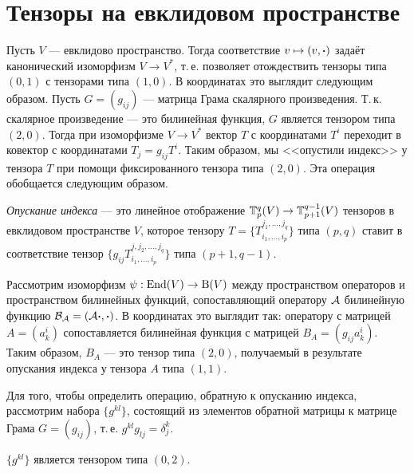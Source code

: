 \section{Тензоры на евклидовом пространстве}

Пусть $V$ --- евклидово пространство. Тогда соответствие $v \mapsto (v, \boldsymbol{\cdot})$ задаёт канонический изоморфизм $V \to V^\ast$, т.\,е. позволяет отождествить тензоры типа $(0, 1)$ с тензорами типа $(1, 0)$. В координатах это выглядит следующим образом. Пусть $G = (g_{ij})$ --- матрица Грама скалярного произведения. Т.\,к. скалярное произведение --- это билинейная функция, $G$ является тензором типа $(2, 0)$. Тогда при изоморфизме $V \to V^\ast$ вектор $T$ с координатами $T^i$ переходит в ковектор с координатами $T_j = g_{ij}T^i$. Таким образом, мы <<опустили индекс>> у тензора $T$ при помощи фиксированного тензора типа $(2, 0)$. Эта операция обобщается следующим образом.

\begin{definition}
    \textit{Опускание индекса} --- это линейное отображение $\mathbb{T}_p^q(V) \to \mathbb{T}_{p + 1}^{q - 1}(V)$ тензоров в евклидовом пространстве $V$, которое тензору $T = \{T_{i_1, \ldots, i_p}^{j_1, \ldots, j_q}\}$ типа $(p, q)$ ставит в соответствие тензор $\{g_{ij}T_{i_1, \ldots, i_p}^{j, j_2, \ldots, j_q}\}$ типа $(p + 1, q - 1)$.
\end{definition}

\begin{example}
    Рассмотрим изоморфизм $\psi: \operatorname{End}(V) \to \mathrm{B}(V)$ между пространством операторов и пространством билинейных функций, сопоставляющий оператору $\mathcal{A}$ билинейную функцию $\mathcal{B}_{\mathcal{A}} = (\mathcal{A}\boldsymbol{\cdot}, \boldsymbol{\cdot})$. В координатах это выглядит так: оператору с матрицей $A = (a^i_k)$ сопоставляется билинейная функция с матрицей $B_A = (g_{ij}a^i_k)$. Таким образом, $B_A$ --- это тензор типа $(2, 0)$, получаемый в результате опускания индекса у тензора $A$ типа $(1, 1)$.
\end{example}

Для того, чтобы определить операцию, обратную к опусканию индекса, рассмотрим набора $\{g^{kl}\}$, состоящий из элементов обратной матрицы к матрице Грама $G = (g_{ij})$, т.\,е. $g^{kl}g_{lj} = \delta^k_j$.

\begin{proposal}
    $\{g^{kl}\}$ является тензором типа $(0, 2)$.
\end{proposal}

